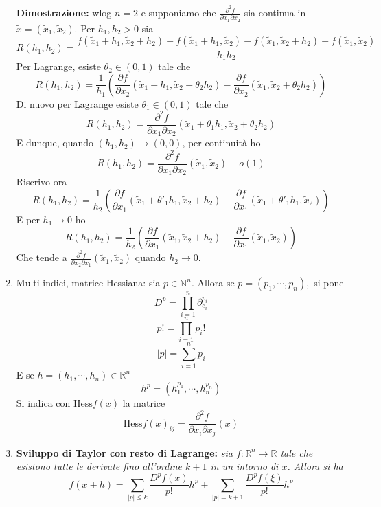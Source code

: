 \documentclass[a4paper,11pt]{article}
\begin{document}
\begin{enumerate}
	\textbf{Dimostrazione:} wlog $n=2$ e supponiamo che $\frac{\partial^2f}{\partial x_1\partial x_2}$ sia continua in $\tilde{x}=(\tilde{x}_1,\tilde{x}_2)$. Per $h_1,h_2>0$ sia
	\[R(h_1,h_2)=\frac{f(\tilde{x}_1+h_1,\tilde{x}_2+h_2)-f(\tilde{x}_1+h_1,\tilde{x}_2)-f(\tilde{x}_1,\tilde{x}_2+h_2)+f(\tilde{x}_1,\tilde{x}_2)}{h_1h_2}\]
	Per Lagrange, esiste $\theta_2\in(0,1)$ tale che
	\[R(h_1,h_2)=\frac{1}{h_1}\left(\frac{\partial f}{\partial x_2}(\tilde{x}_1+h_1,\tilde{x}_2+\theta_2h_2)-\frac{\partial f}{\partial x_2}(\tilde{x}_1,\tilde{x}_2+\theta_2h_2)\right)\]
	Di nuovo per Lagrange esiste $\theta_1\in(0,1)$ tale che 
	\[R(h_1,h_2)=\frac{\partial^2f}{\partial x_1\partial x_2}(\tilde{x}_1+\theta_1h_1,\tilde{x}_2+\theta_2h_2)\]
	E dunque, quando $(h_1,h_2)\to(0,0)$, per continuità ho
	\[R(h_1,h_2)=\frac{\partial^2f}{\partial x_1\partial x_2}(\tilde{x}_1,\tilde{x}_2)+o(1)\]
	Riscrivo ora
	\[R(h_1,h_2)=\frac{1}{h_2}\left(\frac{\partial f}{\partial x_1}(\tilde{x}_1+\theta'_1h_1,\tilde{x}_2+h_2)-\frac{\partial f}{\partial x_1}(\tilde{x}_1+\theta'_1h_1,\tilde{x}_2)\right)\]
	E per $h_1\to 0$ ho
	\[R(h_1,h_2)=\frac{1}{h_2}\left(\frac{\partial f}{\partial x_1}(\tilde{x}_1,\tilde{x}_2+h_2)-\frac{\partial f}{\partial x_1}(\tilde{x}_1,\tilde{x}_2)\right)\]
	Che tende a $\frac{\partial^2f}{\partial x_2\partial x_1}(\tilde{x}_1,\tilde{x}_2)$ quando $h_2\to0$.
	\item Multi-indici, matrice Hessiana: sia $p\in\mathbb{N}^n$. Allora se $p=(p_1,\cdots,p_n),$ si pone
	\[D^p=\prod_{i=1}^{n}\partial^{p_i}_{e_i}\]
	\[p!=\prod_{i=1}^{n}p_i!\]
	\[|p|=\sum_{i=1}^{n}p_i\]
	E se $h=(h_1,\cdots,h_n)\in\mathbb{R}^n$
	\[h^p=(h_1^{p_1},\cdots,h_n^{p_n})\]
	Si indica con $\textrm{Hess}f(x)$ la matrice
	\[\textrm{Hess}f(x)_{ij}=\frac{\partial^2 f}{\partial x_i\partial x_j}(x)\]
	\item\textbf{Sviluppo di Taylor con resto di Lagrange:} \textit{sia $f\colon\mathbb{R}^n\to\mathbb{R}$ tale che esistono tutte le derivate fino all'ordine $k+1$ in un intorno di $x$. Allora si ha
	\[f(x+h)=\sum_{|p|\leq k}\frac{D^pf(x)}{p!}h^p+\sum_{|p|=k+1}\frac{D^pf(\xi)}{p!}h^p\]}


\end{enumerate}
\end{document}
